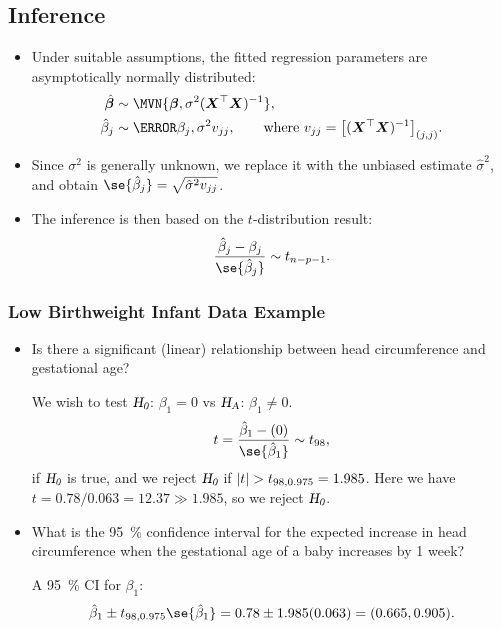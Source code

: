 \documentclass{article}\usepackage[]{graphicx}\usepackage[svgnames]{xcolor}
\newcommand*\circled[1]{\tikz[baseline=(char.base)]{\node[shape=circle,draw,inner sep=2pt] (char) {#1};}}
\newcommand{\HN}{\textsl{H}_{\textsl{0}}}%
\newcommand{\HA}{\textsl{H}_{\textsl{A}}}%
\DeclarePairedDelimiter\abs{\lvert}{\rvert}
\providecommand{\Vector}[1]{\bm{#1}}%
\providecommand{\Matrix}[1]{\bm{#1}}
\begin{document}
\subsection*{\circled{4} Inference}
\begin{itemize}
      \item Under suitable assumptions, the fitted regression parameters are asymptotically
            normally distributed:
            \begin{align*}
                  \hat{\Vector{\beta}} & \sim \MVN{\Vector{\beta},\sigma^2(\Matrix{X}^\top \Matrix{X})^{-1}},                                              \\
                  \hat{\beta}_j        & \sim \N{\beta_j,\sigma^2v_{jj}},\qquad\text{where $v_{jj}=\bigl[(\Matrix{X}^\top\Matrix{X})^{-1}\bigr]_{(j,j)}$}.
            \end{align*}
      \item Since $ \sigma^2 $ is generally unknown, we replace it with the unbiased estimate $ \hat{\sigma}^2 $, and obtain $ \se{\hat{\beta}_j}=\sqrt{\hat{\sigma}^2v_{jj}} $.
      \item The inference is then based on the $t$-distribution result:
            \[ \frac{\hat{\beta}_j-\beta_j}{\se{\hat{\beta}_j}}\sim t_{n-p-1}.  \]
\end{itemize}
\subsubsection*{Low Birthweight Infant Data Example}
\begin{itemize}
      \item Is there a significant (linear) relationship between head circumference and
            gestational age?

            We wish to test $ \HN $: $ \beta_1=0 $ vs $ \HA $: $ \beta_1\ne 0 $.
            \[ t=\frac{\hat{\beta}_1-(0)}{\se{\hat{\beta}_1}}\sim t_{98}, \]
            if $ \HN $ is true, and we reject $ \HN $ if $ \abs{t}>t_{98,0.975}=1.985 $.
            Here we have $ t=0.78/0.063=12.37\gg 1.985 $, so we reject $ \HN $.
      \item What is the \qty{95}{\percent} confidence interval for the expected increase in head
            circumference when the gestational age of a baby increases by 1 week?

            A \qty{95}{\percent} CI for $ \beta_1 $:
            \[ \hat{\beta}_1\pm t_{98,0.975}\se{\hat{\beta}_1}=0.78\pm 1.985(0.063)=(0.665,0.905). \]
\end{itemize}
\end{document}
